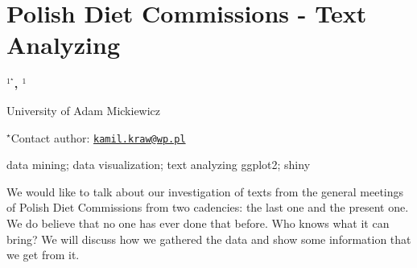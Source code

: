 \documentclass[\main/boa.tex]{subfiles}
\begin{document}
\section{Polish Diet Commissions - Text Analyzing}

\begin{center}
  {\bf {}$^{1^\star}$, $^{1}$}
\end{center}

\vskip 0.3cm

\begin{affiliations}
\begin{enumerate}
\begin{minipage}{0.915\textwidth}
\centering
\item University of Adam Mickiewicz \\[-2pt]
\end{minipage}
\end{enumerate}
$^\star$Contact author: \href{mailto:kamil.kraw@wp.pl}{\nolinkurl{kamil.kraw@wp.pl}}\\
\end{affiliations}

\vskip 0.5cm

\begin{minipage}{0.915\textwidth}
\keywords data mining; data visualization; text analyzing
\packages ggplot2; shiny
\end{minipage}

\vskip 0.8cm

We would like to talk about our investigation of texts from the general
meetings of Polish Diet Commissions from two cadencies: the last one and
the present one. We do believe that no one has ever done that before.
Who knows what it can bring? We will discuss how we gathered the data
and show some information that we get from it.
\end{document}
